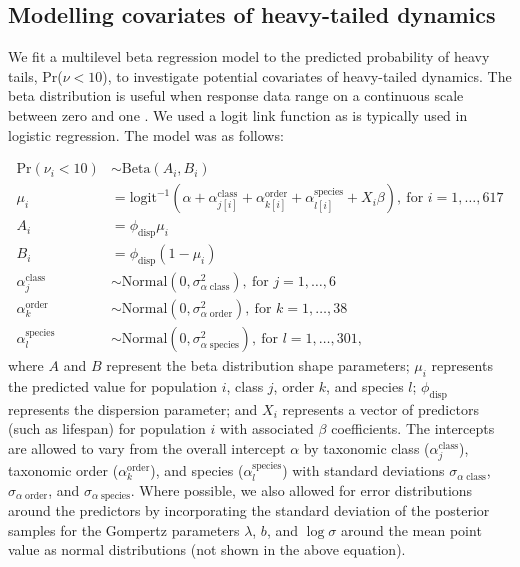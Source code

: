 \subsection{Modelling covariates of heavy-tailed dynamics}

We fit a multilevel beta regression model to the predicted probability of
heavy tails, Pr($\nu < 10$), to investigate potential covariates of
heavy-tailed dynamics. The beta distribution is useful when response data
range on a continuous scale between zero and one \citep{ferrari2004}. We used
a logit link function as is typically used in logistic regression. The model
was as follows:

\begin{align*}
\mathrm{Pr}(\nu_i < 10) &\sim \mathrm{Beta}(A_i, B_i)\\
\mu_i &= \mathrm{logit}^{-1}(\alpha
  + \alpha^\mathrm{class}_{j[i]}
  + \alpha^\mathrm{order}_{k[i]}
  + \alpha^\mathrm{species}_{l[i]}
  + X_i \beta),
  \: \text{for } i = 1, \dots, 617\\
A_i &= \phi_\mathrm{disp} \mu_i\\
B_i &= \phi_\mathrm{disp} (1 - \mu_i)\\
\alpha^\mathrm{class}_j &\sim
  \mathrm{Normal}(0, \sigma^2_{\alpha \; \mathrm{class}}),
  \: \text{for } j = 1, \dots, 6\\
\alpha^\mathrm{order}_k &\sim
  \mathrm{Normal}(0, \sigma^2_{\alpha \; \mathrm{order}}),
  \: \text{for } k = 1, \dots, 38\\
\alpha^\mathrm{species}_l &\sim
  \mathrm{Normal}(0, \sigma^2_{\alpha \; \mathrm{species}}),
  \: \text{for } l = 1, \dots, 301,
\end{align*}
where $A$ and $B$ represent the beta distribution shape parameters; $\mu_i$
represents the predicted value for population $i$, class $j$, order $k$, and
species $l$; $\phi_\mathrm{disp}$ represents the dispersion parameter; and
$X_i$ represents a vector of predictors (such as lifespan) for population $i$
with associated $\beta$ coefficients. The intercepts are allowed to vary from
the overall intercept $\alpha$ by taxonomic class ($\alpha^\mathrm{class}_j$),
taxonomic order ($\alpha^\mathrm{order}_k$), and species
($\alpha^\mathrm{species}_l$) with standard deviations $\sigma_{\alpha \;
  \mathrm{class}}$, $\sigma_{\alpha \; \mathrm{order}}$, and $\sigma_{\alpha
  \; \mathrm{species}}$. Where possible, we also allowed for error
distributions around the predictors by incorporating the standard deviation of
the posterior samples for the Gompertz parameters $\lambda$, $b$, and $\log
\sigma$ around the mean point value as normal distributions (not shown in the
above equation).

